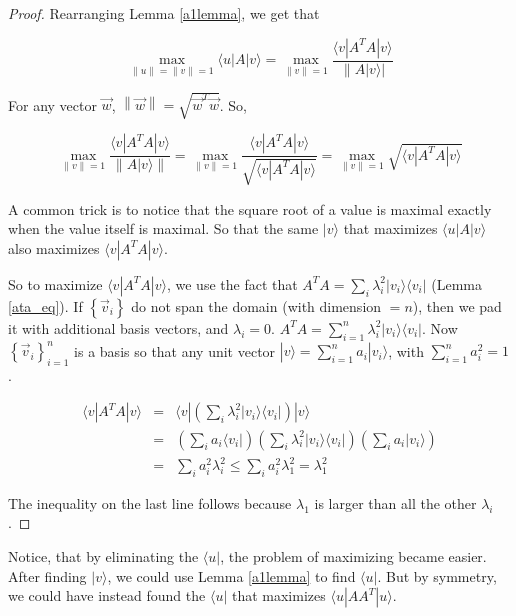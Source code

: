 \documentclass{amsbook}
\begin{document}
\begin{proof}
Rearranging Lemma \ref{a1lemma}, we get that

$$
\max_{\|u\|=\|v\|=1}\langle u|A|v\rangle = \max_{\|v\|=1} \frac{\langle v|A^TA|v\rangle}{\left\|A|v\rangle\right|}
$$

For any vector $\vec w$, $\left\|\vec w\right\|=\sqrt{\vec w^T\vec w}$.  So,

$$
\max_{\|v\|=1} \frac{\langle v|A^TA|v\rangle}{\left\|A|v\rangle\right\|}
= \max_{\|v\|=1} \frac{\langle v|A^TA|v\rangle}{\sqrt{\langle v|A^TA|v\rangle}}
= \max_{\|v\|=1} \sqrt{\langle v|A^TA|v\rangle}
$$

A common trick is to notice that the square root of a value is maximal exactly when the value itself is maximal.  So that the same $|v\rangle$ that maximizes $\langle u|A|v\rangle$ also maximizes $\langle v|A^TA|v\rangle$.

So to maximize $\langle v|A^TA|v\rangle$, we use the fact that $A^TA=\sum_i\lambda_i^2|v_i\rangle\langle v_i|$ (Lemma \ref{ata_eq}).  If $\left\{\vec v_i\right\}$ do not span the domain (with dimension $=n$), then we pad it with additional basis vectors, and $\lambda_i=0$.  $A^TA=\sum_{i=1}^n\lambda_i^2|v_i\rangle\langle v_i|$.  Now $\left\{\vec v_i\right\}_{i=1}^n$ is a basis so that any unit vector $|v\rangle = \sum_{i=1}^na_i|v_i\rangle$, with $\sum_{i=1}^na_i^2 =1$.

\begin{equation}
\label{upperbound_eqn}
\begin{array}{rcl}
\langle v|A^TA|v\rangle &=& \langle v|\left(\sum_i\lambda_i^2|v_i\rangle\langle v_i|\right)|v\rangle \\
 &=& \left(\sum_i a_i\langle v_i|\right)\left(\sum_i\lambda_i^2|v_i\rangle\langle v_i|\right)\left(\sum_i a_i|v_i\rangle\right) \\
 &=& \sum_ia_i^2\lambda_i^2 
 \leq \sum_ia_i^2\lambda_1^2 
 = \lambda_1^2
\end{array}
\end{equation}

The inequality on the last line follows because $\lambda_1$ is larger than all the other $\lambda_i$.
\end{proof}

Notice, that by eliminating the $\langle u|$, the problem of maximizing became easier.  After finding $|v\rangle$, we could use Lemma \ref{a1lemma} to find $\langle u|$.  But by symmetry, we could have instead found the $\langle u|$ that maximizes $\langle u|AA^T|u\rangle$.
\end{document}
